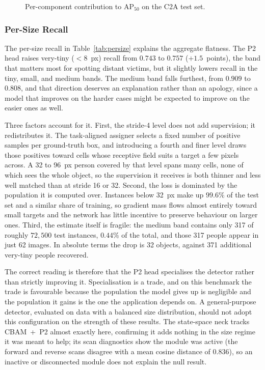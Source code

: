 \documentclass[12pt,a4paper,oneside]{report}
\begin{document}
\begin{figure}[tbp]
  \caption{Per-component contribution to $\mathrm{AP}_{50}$ on the C2A test set.}
  \label{fig:waterfall}
\end{figure}

\subsubsection{Per-Size Recall}
The per-size recall in Table~\ref{tab:persize} explains the aggregate
flatness. The P2 head raises very-tiny ($<8$~px) recall from $0.743$ to
$0.757$ ($+1.5$~points), the band that matters most for spotting distant
victims, but it slightly lowers recall in the tiny, small, and medium bands.
The medium band falls furthest, from $0.909$ to $0.808$, and that direction
deserves an explanation rather than an apology, since a model that improves on
the harder cases might be expected to improve on the easier ones as well.

Three factors account for it. First, the stride-4 level does not add supervision;
it redistributes it. The task-aligned assigner selects a fixed number of positive
samples per ground-truth box, and introducing a fourth and finer level draws
those positives toward cells whose receptive field suits a target a few pixels
across. A 32 to 96~px person covered by that level spans many cells, none of
which sees the whole object, so the supervision it receives is both thinner and
less well matched than at stride 16 or 32. Second, the loss is dominated by the
population it is computed over. Instances below 32~px make up $99.6\%$ of the
test set and a similar share of training, so gradient mass flows almost entirely
toward small targets and the network has little incentive to preserve behaviour
on larger ones. Third, the estimate itself is fragile: the medium band contains
only 317 of roughly $72{,}500$ test instances, $0.44\%$ of the total, and those
317 people appear in just 62 images. In absolute terms the drop is 32 objects,
against 371 additional very-tiny people recovered.

The correct reading is therefore that the P2 head specialises the detector
rather than strictly improving it. Specialisation is a trade, and on this
benchmark the trade is favourable because the population the model gives up is
negligible and the population it gains is the one the application depends on. A
general-purpose detector, evaluated on data with a balanced size distribution,
should not adopt this configuration on the strength of these results. The state-space neck tracks CBAM~+~P2 almost exactly
here, confirming it adds nothing in the size regime it was meant to help; its
scan diagnostics show the module was active (the forward and reverse scans
disagree with a mean cosine distance of $0.836$), so an inactive or disconnected
module does not explain the null result.
\end{document}
